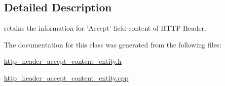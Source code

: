\subsection{Detailed Description}
retains the information for 'Accept' field-\/content of H\-T\-T\-P Header. 

The documentation for this class was generated from the following files\-:\begin{DoxyCompactItemize}
\item 
\hyperlink{http__header__accept__content__entity_8h}{http\-\_\-header\-\_\-accept\-\_\-content\-\_\-entity.\-h}\item 
\hyperlink{http__header__accept__content__entity_8cpp}{http\-\_\-header\-\_\-accept\-\_\-content\-\_\-entity.\-cpp}\end{DoxyCompactItemize}
